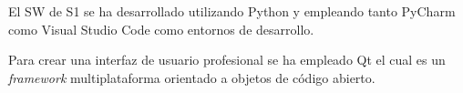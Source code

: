 El \ac{SW} de \ac{S1} se ha desarrollado utilizando Python y empleando tanto PyCharm como Visual Studio Code como entornos de desarrollo. 

Para crear una interfaz de usuario profesional se ha empleado Qt el cual es un \textit{framework} multiplataforma orientado a objetos de código abierto.